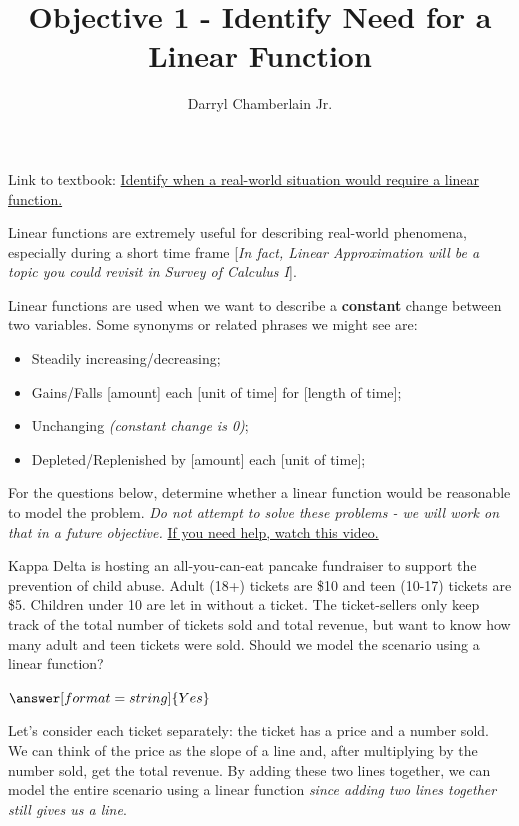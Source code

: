\documentclass{ximera}
\author{Darryl Chamberlain Jr.}
\title{Objective 1 - Identify Need for a Linear Function}
\begin{document}
\begin{abstract}

\end{abstract}

\maketitle
 
Link to textbook: 
\href{https://cnx.org/contents/mwjClAV_@8.12:3PeE3KzR@10/Modeling-with-Linear-Functions}{Identify when a real-world situation would require a linear function.}
 

Linear functions are extremely useful for describing real-world phenomena, especially during a short time frame [\textit{In fact, Linear Approximation will be a topic you could revisit in Survey of Calculus I}]. 

Linear functions are used when we want to describe a \textbf{constant} change between two variables. Some synonyms or related phrases we might see are:
	\begin{itemize}
		\item Steadily increasing/decreasing;
		\item Gains/Falls [amount] each [unit of time] for [length of time];
		\item Unchanging \textit{(constant change is 0)};
		\item Depleted/Replenished by [amount] each [unit of time];
	\end{itemize}

For the questions below, determine whether a linear function would be reasonable to model the problem. \textit{Do not attempt to solve these problems - we will work on that in a future objective.} \href{https://www.youtube.com/watch?v=9Uw1YTAipPY&list=PLsCqF7qYpC5ZynJm-TTnZ6OsnKOwU7hs_&index=1}{If you need help, watch this video.}

\begin{question}
Kappa Delta is hosting an all-you-can-eat pancake fundraiser to support the prevention of child abuse. Adult (18+) tickets are \$10 and teen (10-17) tickets are \$5. Children under 10 are let in without a ticket. The ticket-sellers only keep track of the total number of tickets sold and total revenue, but want to know how many adult and teen tickets were sold. Should we model the scenario using a linear function?

$\answer[format=string]{Yes}$

\begin{feedback}
Let's consider each ticket separately: the ticket has a price and a number sold. We can think of the price as the slope of a line and, after multiplying by the number sold, get the total revenue. By adding these two lines together, we can model the entire scenario using a linear function \textit{since adding two lines together still gives us a line}.
\end{feedback}

\end{question}
\end{document}
